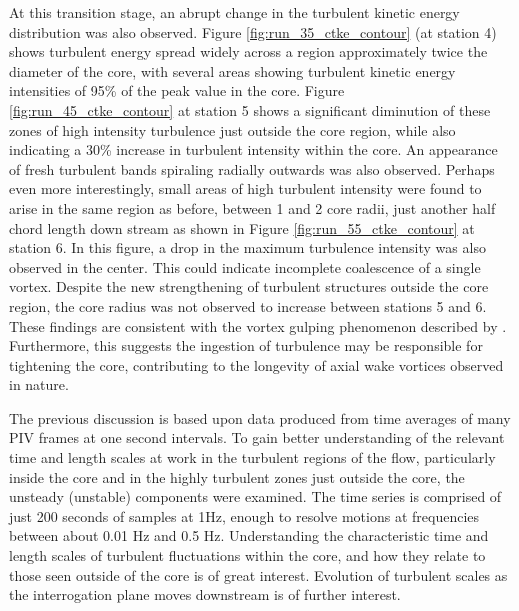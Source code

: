 At this transition stage, an abrupt change in the turbulent 
kinetic energy distribution was also observed. Figure 
\ref{fig:run_35_ctke_contour} (at station 4) shows turbulent energy spread 
widely across a region approximately twice the diameter of the core, with 
several areas showing turbulent kinetic energy intensities of 95\% of the peak 
value in the core. Figure \ref{fig:run_45_ctke_contour} at station 5 shows a 
significant diminution of these zones of high intensity turbulence just outside 
the core region, while also indicating a 30\% increase in turbulent intensity 
within the core. An appearance of fresh turbulent bands spiraling radially
outwards was also observed. Perhaps even more interestingly, small areas of 
high turbulent intensity were found to arise in the same region as before, 
between 1 and 2 core radii, just another half chord length down stream as shown 
in Figure \ref{fig:run_55_ctke_contour} at station 6. In this figure, a drop 
in the maximum turbulence intensity was also observed in the center. This could 
indicate incomplete coalescence of a single vortex. Despite 
the new strengthening of turbulent structures outside the core region, the core 
radius was not observed to increase between stations 5 and 6. These findings 
are consistent with the vortex gulping phenomenon described by 
\cite{bandyopadhyay1991}. Furthermore, this suggests the ingestion of 
turbulence may be responsible for tightening the core, contributing to the 
longevity of axial wake vortices observed in nature.





The previous discussion is based upon data produced from time averages of many 
PIV frames at one second intervals. To gain better understanding of the 
relevant time and 
length scales at work in the turbulent regions of the flow, particularly inside 
the core and in the highly turbulent zones just outside the core, the unsteady 
(unstable) components were examined. The time series is comprised of just 200 
seconds of samples at 1Hz, enough to resolve motions at frequencies between 
about 0.01 Hz and 0.5 Hz. Understanding the characteristic time and length 
scales of turbulent fluctuations within the core, and how they relate to those 
seen outside of the core is of great interest. Evolution of turbulent scales as 
the interrogation plane moves downstream is of further interest. 

\makeatletter
{}
\makeatother

